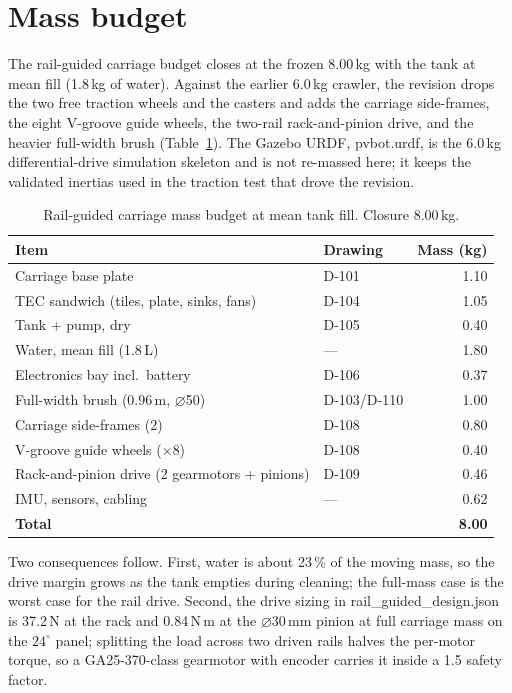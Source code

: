 \documentclass[11pt,a4paper]{article}
\newcommand{\fpath}[1]{{\ttfamily\small #1}}
\begin{document}
\section{Mass budget}
\label{sec:mass}
The rail-guided carriage budget closes at the frozen 8.00\,kg with the tank at
mean fill (1.8\,kg of water). Against the earlier 6.0\,kg crawler, the
revision drops the two free traction wheels and the casters and adds the
carriage side-frames, the eight V-groove guide wheels, the two-rail
rack-and-pinion drive, and the heavier full-width brush (Table~\ref{tab:mass}).
The Gazebo URDF, \fpath{pvbot.urdf}, is the 6.0\,kg differential-drive
simulation skeleton and is not re-massed here; it keeps the validated inertias
used in the traction test that drove the revision.

\begin{table}[h]
\centering
\caption{Rail-guided carriage mass budget at mean tank fill. Closure 8.00\,kg.}
\label{tab:mass}
\small
\begin{tabular}{llr}
\toprule
Item & Drawing & Mass (kg) \\
\midrule
Carriage base plate & D-101 & 1.10 \\
TEC sandwich (tiles, plate, sinks, fans) & D-104 & 1.05 \\
Tank + pump, dry & D-105 & 0.40 \\
Water, mean fill (1.8\,L) & --- & 1.80 \\
Electronics bay incl.\ battery & D-106 & 0.37 \\
Full-width brush ($0.96$\,m, $\varnothing$50) & D-103/D-110 & 1.00 \\
Carriage side-frames (2) & D-108 & 0.80 \\
V-groove guide wheels ($\times$8) & D-108 & 0.40 \\
Rack-and-pinion drive (2 gearmotors + pinions) & D-109 & 0.46 \\
IMU, sensors, cabling & --- & 0.62 \\
\midrule
\textbf{Total} & & \textbf{8.00} \\
\bottomrule
\end{tabular}
\end{table}

Two consequences follow. First, water is about 23\,\% of the moving mass, so
the drive margin grows as the tank empties during cleaning; the full-mass case
is the worst case for the rail drive. Second, the drive sizing in
\fpath{rail\_guided\_design.json} is 37.2\,N at the rack and 0.84\,N\,m at the
$\varnothing$30\,mm pinion at full carriage mass on the $24^\circ$ panel;
splitting the load across two driven rails halves the per-motor torque, so a
GA25-370-class gearmotor with encoder carries it inside a 1.5 safety factor.
\end{document}
